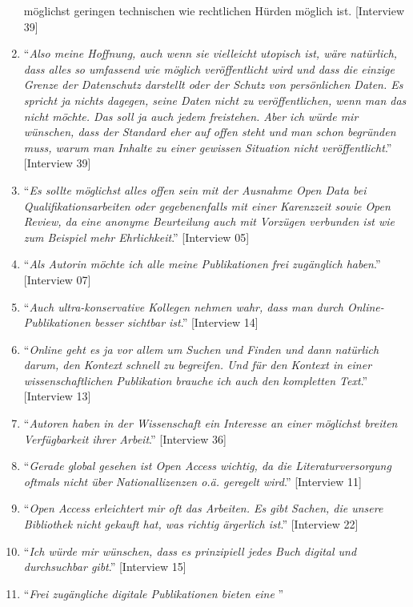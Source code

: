 \documentclass[a4paper,
fontsize=11pt,
oneside,
numbers=noperiodatend,
parskip=half-,
bibliography=totoc,
final
]{scrartcl}
\begin{document}
\begin{enumerate}
{{  möglichst geringen technischen wie rechtlichen Hürden möglich ist}.}
  {[}Interview 39{]}
\item
  \enquote{\emph{Also meine Hoffnung, auch wenn sie vielleicht utopisch
  ist, wäre natürlich, dass alles so umfassend wie möglich
  veröffentlicht wird und dass die einzige Grenze der Datenschutz
  darstellt oder der Schutz von persönlichen Daten. Es spricht ja nichts
  dagegen, seine Daten nicht zu veröffentlichen, wenn man das nicht
  möchte. Das soll ja auch jedem freistehen. Aber ich würde mir
  wünschen, dass der Standard eher auf offen steht und man schon
  begründen muss, warum man Inhalte zu einer gewissen Situation nicht
  veröffentlicht}.} {[}Interview 39{]}
\item
  \enquote{\emph{Es sollte möglichst alles offen sein mit der Ausnahme
  Open Data bei Qualifikationsarbeiten oder gegebenenfalls mit einer
  Karenzzeit sowie Open Review, da eine anonyme Beurteilung auch mit
  Vorzügen verbunden ist wie zum Beispiel mehr Ehrlichkeit}.}
  {[}Interview 05{]}
\item
  \enquote{\emph{Als Autorin möchte ich alle meine Publikationen frei
  zugänglich haben}.} {[}Interview 07{]}
\item
  \enquote{\emph{Auch ultra-konservative Kollegen nehmen wahr, dass man
  durch Online-Publikationen besser sichtbar ist}.} {[}Interview 14{]}
\item
  \enquote{\emph{Online geht es ja vor allem um Suchen und Finden und
  dann natürlich darum, den Kontext schnell zu begreifen. Und für den
  Kontext in einer wissenschaftlichen Publikation brauche ich auch den
  kompletten Text}.} {[}Interview 13{]}
\item
  \enquote{\emph{Autoren haben in der Wissenschaft ein Interesse an
  einer möglichst breiten Verfügbarkeit ihrer Arbeit}.} {[}Interview
  36{]}
\item
  \enquote{\emph{Gerade global gesehen ist Open Access wichtig, da die
  Literaturversorgung oftmals nicht über Nationallizenzen o.ä. geregelt
  wird}.} {[}Interview 11{]}
\item
  \enquote{\emph{Open Access erleichtert mir oft das Arbeiten. Es gibt
  Sachen, die unsere Bibliothek nicht gekauft hat, was richtig ärgerlich
  ist}.} {[}Interview 22{]}
\item
  \enquote{\emph{Ich würde mir wünschen, dass es prinzipiell jedes Buch
  digital und durchsuchbar gibt}.} {[}Interview 15{]}
\item
  \enquote{\emph{Frei zugängliche digitale Publikationen bieten eine
}}
\end{enumerate}
\end{document}
